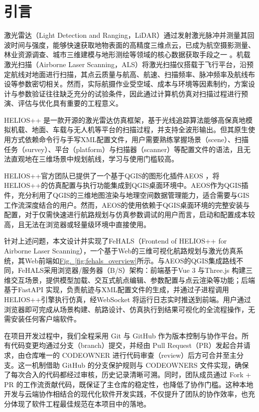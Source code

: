 \documentclass[a4paper,fleqn]{cas-sc}
\newcommand{\refFig}[1]{\hyperref[#1]{Fig.~\ref*{#1}}}
\begin{document}
\section{引言}
激光雷达（Light Detection and Ranging，LiDAR）通过发射激光脉冲并测量其回波时间与强度，能够快速获取地物表面的高精度三维点云，已成为航空摄影测量、林业资源调查、城市三维建模与地形测绘等领域的核心数据获取手段之一 \citep{laserRemoteSensing}。机载激光扫描（Airborne Laser Scanning，ALS）将激光扫描仪搭载于飞行平台，沿预定航线对地面进行扫描，其点云质量与航高、航速、扫描频率、脉冲频率及航线布设等参数密切相关。然而，实际航摄作业受空域、成本与环境等因素制约，方案设计与参数验证往往缺乏充分的试验条件，因此通过计算机仿真对扫描过程进行预演、评估与优化具有重要的工程意义。

HELIOS++ \citep{heliosPlusPlus} 是一款开源的激光雷达仿真框架，基于光线追踪算法能够高保真地模拟机载、地面、车载与无人机等平台的扫描过程，并支持全波形输出。但其原生使用方式依赖命令行与手写XML配置文件，用户需要熟练掌握场景（scene）、扫描任务（survey）、平台（platform）与扫描器（scanner）等配置文件的语法，且无法直观地在三维场景中规划航线，学习与使用门槛较高。

HELIOS++官方团队已提供了一个基于QGIS的图形化插件AEOS \citep{aeos}，将HELIOS++的仿真配置与执行功能集成到QGIS桌面环境中。AEOS作为QGIS插件，充分利用了QGIS的三维地图渲染与地理空间数据管理能力，适合需要与GIS工作流深度结合的用户。然而，AEOS的使用依赖于QGIS桌面环境的完整安装与配置，对于仅需快速进行航路规划与仿真参数调试的用户而言，启动和配置成本较高，且无法在浏览器或轻量级环境中直接使用。

针对上述问题，本文设计并实现了FeHALS（Frontend of HELIOS++ for Airborne Laser Scanning），一个基于Web的三维可视化航路规划与激光仿真系统，其Web前端如\refFig{fig:fehals_overview}所示。与AEOS的QGIS集成路线不同，FeHALS采用浏览器/服务器（B/S）架构：前端基于Vue 3 \citep{vuejs} 与Three.js \citep{threejs} 构建三维交互场景，提供模型加载、交互式航点编辑、参数配置与点云渲染等功能；后端基于FastAPI \citep{fastapi} 实现，负责航迹与XML配置文件的生成，并通过子进程调用HELIOS++引擎执行仿真，经WebSocket \citep{WebSocket} 将运行日志实时推送到前端。用户通过浏览器即可完成从场景构建、航路设计、仿真执行到结果可视化的全流程操作，无需安装任何客户端软件。

在项目开发过程中，我们全程采用 Git 与 GitHub 作为版本控制与协作平台。所有代码变更均通过分支（branch）提交，并经由 Pull Request（PR）发起合并请求，由仓库唯一的 CODEOWNER 进行代码审查（review）后方可合并至主分支。这一机制借助 GitHub 的分支保护规则与 CODEOWNERS 文件实现，确保了每次合入的代码都经过审核，历史记录清晰可溯。同时，团队成员通过 Fork + PR 的工作流贡献代码，既保证了主仓库的稳定性，也降低了协作门槛。这种本地开发与云端协作相结合的现代化软件开发实践，不仅提升了团队的协作效率，也充分体现了软件工程最佳规范在本项目中的落地。
\end{document}
